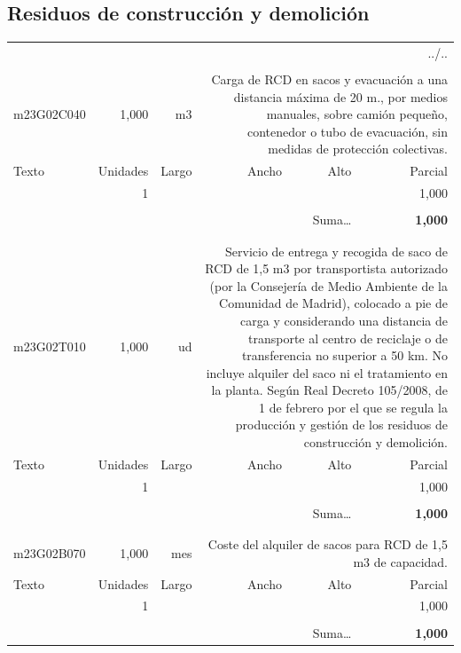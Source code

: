 \documentclass{book}%
\begin{document}
\subsection{Residuos de construcción y demolición}%
\begin{longtable}{lrrrrr}%
\multicolumn{6}{r}{../..}\\%
\endfoot%
\endlastfoot%
&&&&&\\%
m23G02C040&     1,000& m3&\multicolumn{3}{p{6cm}}{\scriptsize Carga de RCD en sacos y evacuación a una distancia máxima de 20 m., por medios manuales, sobre camión pequeño, contenedor o tubo de evacuación, sin medidas de protección colectivas.\normalsize}\\%
Texto&Unidades&Largo&Ancho&Alto&Parcial\\%
\hline%
\multicolumn{1}{p{3.5cm}}{ }&1&&&&     1,000\\%
&&&&&\\%
\multicolumn{5}{r}{Suma\ldots}&\textbf{     1,000}\\%
\hline%
&&&&&\\%
&&&&&\\%
m23G02T010&     1,000& ud&\multicolumn{3}{p{6cm}}{\scriptsize Servicio de entrega y recogida de saco de RCD de 1,5 m3 por transportista autorizado (por la Consejería de Medio Ambiente de la Comunidad de Madrid), colocado a pie de carga y considerando una distancia de transporte al centro de reciclaje o de transferencia no superior a 50 km. No incluye alquiler del saco ni el tratamiento en la planta. Según Real Decreto 105/2008, de 1 de febrero por el que se regula la producción y gestión de los residuos de construcción y demolición.\normalsize}\\%
Texto&Unidades&Largo&Ancho&Alto&Parcial\\%
\hline%
\multicolumn{1}{p{3.5cm}}{ }&1&&&&     1,000\\%
&&&&&\\%
\multicolumn{5}{r}{Suma\ldots}&\textbf{     1,000}\\%
\hline%
&&&&&\\%
&&&&&\\%
m23G02B070&     1,000& mes&\multicolumn{3}{p{6cm}}{\scriptsize Coste del alquiler de sacos para RCD de 1,5 m3 de capacidad.\normalsize}\\%
Texto&Unidades&Largo&Ancho&Alto&Parcial\\%
\hline%
\multicolumn{1}{p{3.5cm}}{ }&1&&&&     1,000\\%
&&&&&\\%
\multicolumn{5}{r}{Suma\ldots}&\textbf{     1,000}\\%

\end{longtable}
\end{document}

